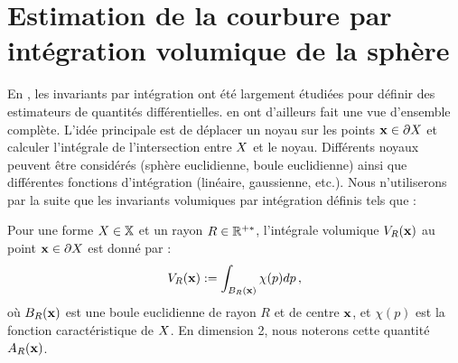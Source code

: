 \section{Estimation de la courbure par intégration volumique de la sphère}
\label{sec:estimators:volume}
%
En \GeometryProcessing, les invariants par intégration ont été largement
étudiées pour définir des estimateurs de quantités différentielles.
 en ont d'ailleurs fait une vue
d'ensemble complète. L'idée principale est de déplacer un noyau sur les points
$\mathbf{x} \in \partial X$ et calculer l'intégrale de l'intersection entre $X$ et le
noyau. Différents noyaux peuvent être considérés (sphère euclidienne, boule
euclidienne) ainsi que différentes fonctions d'intégration (linéaire,
gaussienne, etc.). Nous n'utiliserons par la suite que les invariants volumiques
par intégration définis tels que :
\begin{definition}\label{def:Volume}
  Pour une forme $X \in \mathbb{X}$ et un rayon $R \in \mathbb{R}^{+*}$, l'intégrale
  volumique $V_R(\mathbf{x})$ au point $\mathbf{x} \in \partial X$ est donné par :
  \begin{equation}
    V_R(\mathbf{x}) := \int_{B_{R}(\mathbf{x})}  \chi(p)dp\,,
  \end{equation}
  où $B_{R}(\mathbf{x})$ est une boule euclidienne de rayon $R$ et de centre $\mathbf{x}$, et
  $\chi(p)$ est la fonction caractéristique de $X$. En dimension 2, nous
  noterons cette quantité $A_R(\mathbf{x})$.
\end{definition}
%
